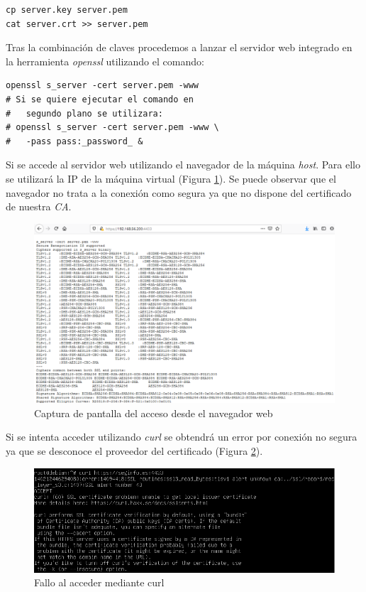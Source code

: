 \documentclass[10pt,a4paper]{article}
\begin{document}
\begin{lstlisting}
cp server.key server.pem
cat server.crt >> server.pem
\end{lstlisting}

Tras la combinación de claves procedemos a lanzar el servidor web integrado en la herramienta \emph{openssl} utilizando el comando:

\begin{lstlisting}
openssl s_server -cert server.pem -www
# Si se quiere ejecutar el comando en 
#	segundo plano se utilizara:
# openssl s_server -cert server.pem -www \ 
#	-pass pass:_password_ &
\end{lstlisting}

Si se accede al servidor web utilizando el navegador de la máquina \emph{host}. Para ello se utilizará la IP de la máquina virtual (Figura \ref{fig:tarea3_paso2}). Se puede observar que el navegador no trata a la conexión como segura ya que no dispone del certificado de nuestra \emph{CA}.\\


\begin{figure}[h!]
\centering
\includegraphics[scale=0.4]{images/tarea3_paso2.png}
\caption{Captura de pantalla del acceso desde el navegador web}
\label{fig:tarea3_paso2}
\end{figure}
\newpage

Si se intenta acceder utilizando \emph{curl} se obtendrá un error por conexión no segura ya que se desconoce el proveedor del certificado (Figura \ref{fig:tarea3_fallo_curl}).\\
 
\begin{figure}[h!]
	\centering
	\includegraphics[scale=0.4]{images/tarea3_fallo_curl.png}
	\caption{Fallo al acceder mediante curl}
	\label{fig:tarea3_fallo_curl}
\end{figure}
\end{document}
